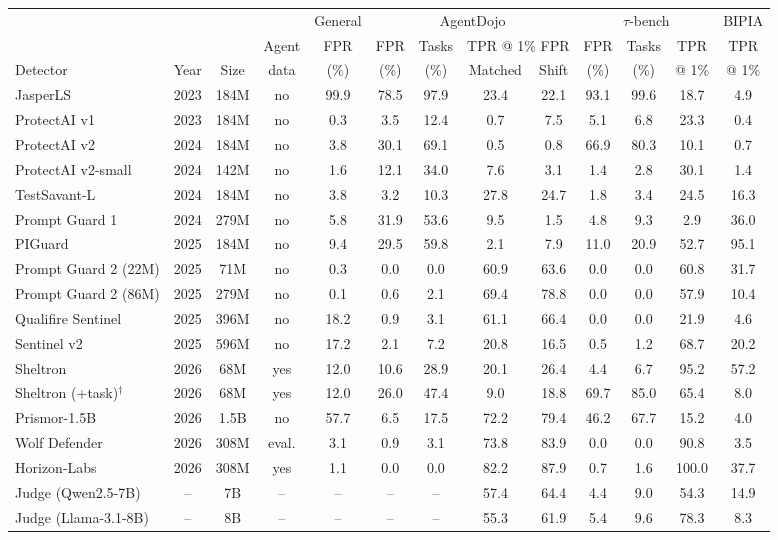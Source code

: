 \begin{tabular}{@{}lccc|c|cc|cc|ccc|c@{}}
\toprule
 & & & & General & \multicolumn{4}{c|}{AgentDojo} & \multicolumn{3}{c|}{$\tau$-bench} & BIPIA \\
 & & & Agent & FPR & FPR & Tasks & \multicolumn{2}{c|}{TPR @ 1\% FPR} & FPR & Tasks & TPR & TPR \\
Detector & Year & Size & data & (\%) & (\%) & (\%) & Matched & Shift & (\%) & (\%) & @ 1\% & @ 1\% \\
\midrule
JasperLS & 2023 & 184M & no & 99.9 & 78.5 & 97.9 & 23.4 & 22.1 & 93.1 & 99.6 & 18.7 & 4.9 \\
ProtectAI v1 & 2023 & 184M & no & 0.3 & 3.5 & 12.4 & 0.7 & 7.5 & 5.1 & 6.8 & 23.3 & 0.4 \\
ProtectAI v2 & 2024 & 184M & no & 3.8 & 30.1 & 69.1 & 0.5 & 0.8 & 66.9 & 80.3 & 10.1 & 0.7 \\
ProtectAI v2-small & 2024 & 142M & no & 1.6 & 12.1 & 34.0 & 7.6 & 3.1 & 1.4 & 2.8 & 30.1 & 1.4 \\
TestSavant-L & 2024 & 184M & no & 3.8 & 3.2 & 10.3 & 27.8 & 24.7 & 1.8 & 3.4 & 24.5 & 16.3 \\
Prompt Guard 1 & 2024 & 279M & no & 5.8 & 31.9 & 53.6 & 9.5 & 1.5 & 4.8 & 9.3 & 2.9 & 36.0 \\
PIGuard & 2025 & 184M & no & 9.4 & 29.5 & 59.8 & 2.1 & 7.9 & 11.0 & 20.9 & 52.7 & 95.1 \\
Prompt Guard 2 (22M) & 2025 & 71M & no & 0.3 & 0.0 & 0.0 & 60.9 & 63.6 & 0.0 & 0.0 & 60.8 & 31.7 \\
Prompt Guard 2 (86M) & 2025 & 279M & no & 0.1 & 0.6 & 2.1 & 69.4 & 78.8 & 0.0 & 0.0 & 57.9 & 10.4 \\
Qualifire Sentinel & 2025 & 396M & no & 18.2 & 0.9 & 3.1 & 61.1 & 66.4 & 0.0 & 0.0 & 21.9 & 4.6 \\
Sentinel v2 & 2025 & 596M & no & 17.2 & 2.1 & 7.2 & 20.8 & 16.5 & 0.5 & 1.2 & 68.7 & 20.2 \\
Sheltron & 2026 & 68M & yes & 12.0 & 10.6 & 28.9 & 20.1 & 26.4 & 4.4 & 6.7 & 95.2 & 57.2 \\
Sheltron (+task)$^\dagger$ & 2026 & 68M & yes & 12.0 & 26.0 & 47.4 & 9.0 & 18.8 & 69.7 & 85.0 & 65.4 & 8.0 \\
Prismor-1.5B & 2026 & 1.5B & no & 57.7 & 6.5 & 17.5 & 72.2 & 79.4 & 46.2 & 67.7 & 15.2 & 4.0 \\
Wolf Defender & 2026 & 308M & eval. & 3.1 & 0.9 & 3.1 & 73.8 & 83.9 & 0.0 & 0.0 & 90.8 & 3.5 \\
Horizon-Labs & 2026 & 308M & yes & 1.1 & 0.0 & 0.0 & 82.2 & 87.9 & 0.7 & 1.6 & 100.0 & 37.7 \\
\midrule
Judge (Qwen2.5-7B) & -- & 7B & -- & -- & -- & -- & 57.4 & 64.4 & 4.4 & 9.0 & 54.3 & 14.9 \\
Judge (Llama-3.1-8B) & -- & 8B & -- & -- & -- & -- & 55.3 & 61.9 & 5.4 & 9.6 & 78.3 & 8.3 \\
\bottomrule
\end{tabular}
